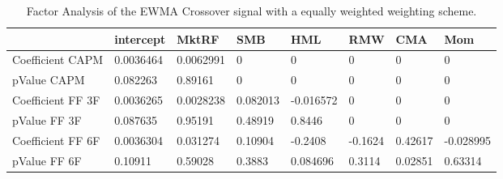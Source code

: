 \begin{table}[H]
\centering
\begin{tabular}{llllllll}
\hline& intercept & MktRF & SMB & HML & RMW & CMA & Mom \\ 
\hline 
Coefficient CAPM & 0.0036464 & 0.0062991 & 0 & 0 & 0 & 0 & 0 \\ 
pValue CAPM & 0.082263 & 0.89161 & 0 & 0 & 0 & 0 & 0 \\ 
Coefficient FF 3F & 0.0036265 & 0.0028238 & 0.082013 & -0.016572 & 0 & 0 & 0 \\ 
pValue FF 3F & 0.087635 & 0.95191 & 0.48919 & 0.8446 & 0 & 0 & 0 \\ 
Coefficient FF 6F & 0.0036304 & 0.031274 & 0.10904 & -0.2408 & -0.1624 & 0.42617 & -0.028995 \\ 
pValue FF 6F & 0.10911 & 0.59028 & 0.3883 & 0.084696 & 0.3114 & 0.02851 & 0.63314 \\ 
\hline
\end{tabular}
\caption{Factor Analysis of the EWMA Crossover signal with a equally weighted weighting scheme.}
\label{MBBSEWOQ_FACTOR}
\end{table}